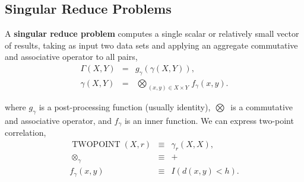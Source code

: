 \documentclass[times, leqno,twocolumn]{article}
\DeclareMathOperator{\TWOPT}{TWOPOINT}
\newcommand{\defterm}[1]{{\bf #1}}
\newcommand{\nameOp}[2]{\mathop{#1\nolimits\!\!_{#2}}}
\newcommand{\nameop}[2]{{\scriptstyle\:}#1_{\!#2}}
\newcommand{\myOp}[1]{\nameOp{\bigotimes}{#1}}
\newcommand{\myop}[1]{\nameop{\otimes}{#1}}
\newcommand{\letterglob}{\gamma}
\newcommand{\outglob}{\Gamma}
\newcommand{\inglob}{\gamma}
\newcommand{\Opglob}{\myOp{\letterglob}}
\newcommand{\opglob}{\myop{\letterglob}}
\newcommand{\fglob}{f_{\!\letterglob}}
\newcommand{\gglob}{g_{\!\letterglob}}
\begin{document}



\subsection{Singular Reduce Problems}

A \defterm{singular reduce problem} computes a single scalar or relatively small vector of results, taking as input two data sets and applying an aggregate commutative and associative operator to all pairs,
\begin{eqnarray*}
\outglob(X, Y) &=& \gglob(\inglob(X, Y)),
\\
\inglob(X, Y) &=& \Opglob_{(x, y) \in X \times Y} \fglob(x, y).
\label{eqn:defglob}
\end{eqnarray*}

\noindent where $\gglob$ is a post-processing function (usually identity), $\Opglob$ is a commutative and associative operator, and $\fglob$ is an inner function.
We can express two-point correlation,
\[\begin{array}{rcl}
\TWOPT(X, r) &\equiv& \inglob_r(X, X),
\\
\opglob &\equiv& +
\\
\fglob(x, y) &\equiv& I(d(x, y) < h).
\end{array}\]
\end{document}
